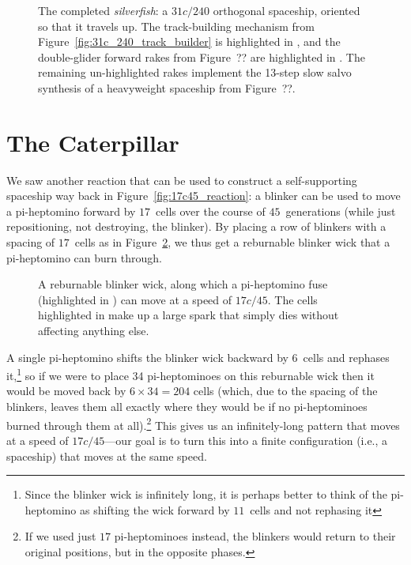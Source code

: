 \begin{figure}[!htbp]
	\centering
	\caption{The completed \emph{silverfish}: a $31c/240$ orthogonal spaceship, oriented so that it travels up. The track-building mechanism from Figure~\ref{fig:31c_240_track_builder} is highlighted in , and the double-glider forward rakes from Figure~?? are highlighted in . The remaining un-highlighted rakes implement the 13-step slow salvo synthesis of a heavyweight spaceship from Figure~??.}\label{fig:silverfish}
\end{figure}


\section{The Caterpillar}\label{sec:caterpillar}

We saw another reaction that can be used to construct a self-supporting spaceship way back in Figure~\ref{fig:17c45_reaction}: a blinker can be used to move a pi-heptomino forward by $17$~cells over the course of $45$~generations (while just repositioning, not destroying, the blinker). By placing a row of blinkers with a spacing of $17$~cells as in Figure~\ref{fig:reburnable_blinker_wick}, we thus get a reburnable blinker wick that a pi-heptomino can burn through.

\begin{figure}[!htb]
	\centering
	\caption{A reburnable blinker wick, along which a pi-heptomino fuse (highlighted in ) can move at a speed of $17c/45$. The cells highlighted in  make up a large spark that simply dies without affecting anything else.}\label{fig:reburnable_blinker_wick}
\end{figure}


A single pi-heptomino shifts the blinker wick backward by $6$~cells and rephases it,\footnote{Since the blinker wick is infinitely long, it is perhaps better to think of the pi-heptomino as shifting the wick forward by $11$~cells and not rephasing it} so if we were to place 34 pi-heptominoes on this reburnable wick then it would be moved back by $6 \times 34 = 204$ cells (which, due to the spacing of the blinkers, leaves them all exactly where they would be if no pi-heptominoes burned through them at all).\footnote{If we used just $17$ pi-heptominoes instead, the blinkers would return to their original positions, but in the opposite phases.} This gives us an infinitely-long pattern that moves at a speed of $17c/45$---our goal is to turn this into a finite configuration (i.e., a spaceship) that moves at the same speed.

